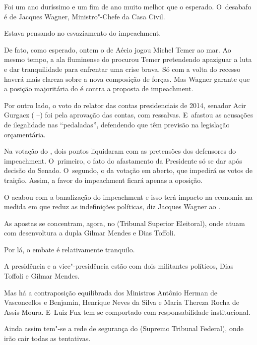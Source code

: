  

Foi um ano duríssimo e um fim de ano muito melhor que o esperado. O~desabafo é de Jacques Wagner, Ministro"-Chefe da Casa Civil.

Estava pensando no esvaziamento do impeachment.

De fato, como esperado, ontem o  de Aécio jogou Michel Temer ao mar.
Ao mesmo tempo, a ala fluminense do  procurou Temer pretendendo
apaziguar a luta e dar tranquilidade para enfrentar uma crise brava. Só
com a volta do recesso haverá mais clareza sobre a nova composição de
forças. Mas Wagner garante que a posição majoritária do  é contra a
proposta de impeachment.

Por outro lado, o voto do relator das contas presidenciais de 2014,
senador Acir Gurgacz ( --) foi pela aprovação das contas, com
ressalvas. E~afastou as acusações de ilegalidade nas ``pedaladas'',
defendendo que têm previsão na legislação orçamentária.

\asterisc{}

Na votação do , dois pontos liquidaram com as pretensões dos
defensores do impeachment. O~primeiro, o fato do afastamento da
Presidente só se dar após decisão do Senado. O~segundo, o da votação em
aberto, que impedirá os votos de traição. Assim, a favor do impeachment
ficará apenas a oposição.

O  acabou com a banalização do impeachment e isso terá impacto na
economia na medida em que reduz as indefinições políticas, diz Jacques
Wagner ao .

\asterisc{}

As apostas se concentram, agora, no  (Tribunal Superior Eleitoral),
onde atuam com desenvoltura a dupla Gilmar Mendes e Dias Toffoli.

Por lá, o embate é relativamente tranquilo.

A presidência e a vice"-presidência estão com dois militantes políticos,
Dias Toffoli e Gilmar Mendes.

Mas há a contraposição equilibrada dos Ministros Antônio Herman de
Vasconcellos e Benjamin, Henrique Neves da Silva e Maria Thereza Rocha
de Assis Moura. E~Luiz Fux tem se comportado com responsabilidade
institucional.

Ainda assim tem"-se a rede de segurança do  (Supremo Tribunal
Federal), onde irão cair todas as tentativas.

